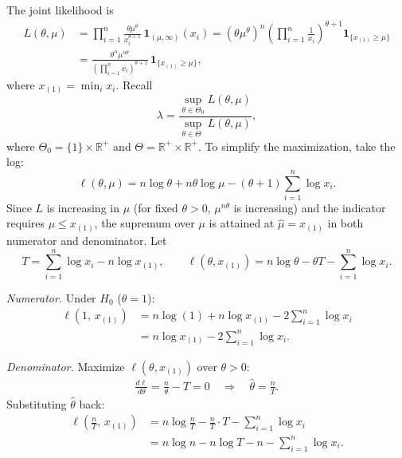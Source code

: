 \documentclass{article}
\theoremstyle{plain}
\theoremstyle{definition}
\newcommand{\bbR}{\mathbb{R}}
\newcommand{\ind}[1]{\bm{1}_{\{#1\}}}
\begin{document}
The joint likelihood is
\begin{align*}
  L(\theta,\mu)
  &=
  \prod_{i=1}^{n}\frac{\theta\mu^{\theta}}{x_i^{\theta+1}}\,\mathbf{1}_{(\mu,\infty)}(x_i)
  =
  (\theta\mu^{\theta})^{n}\!\left(\prod_{i=1}^{n}\frac{1}{x_i}\right)^{\!\theta+1}
  \ind{x_{(1)}\ge\mu}\\
  &= \frac{\theta^{n}\mu^{n\theta}}{(\prod_{i=1}^{n}x_i)^{\theta+1}}\,
  \ind{x_{(1)}\ge\mu},
\end{align*}
where $x_{(1)}=\min_i x_i$.  Recall
\[
  \lambda
  = \frac{\displaystyle\sup_{\theta\in\Theta_0}L(\theta,\mu)}
  {\displaystyle\sup_{\theta\in\Theta\phantom{_0}}L(\theta,\mu)},
\]
where $\Theta_0=\{1\}\times\bbR^+$ and $\Theta=\bbR^+\times\bbR^+$.
To simplify the maximization, take the log:
\[
  \ell(\theta,\mu) = n\log\theta + n\theta\log\mu -
  (\theta+1)\sum_{i=1}^{n}\log x_i.
\]
Since $L$ is increasing in $\mu$ (for fixed $\theta>0$, $\mu^{n\theta}$
is increasing) and the indicator requires $\mu\le x_{(1)}$, the
supremum over $\mu$ is attained at $\hat\mu=x_{(1)}$ in both numerator
and denominator.  Let
\[
  T = \sum_{i=1}^{n}\log x_i - n\log x_{(1)}, \qquad
  \ell(\theta,x_{(1)}) = n\log\theta - \theta T - \sum_{i=1}^{n}\log x_i.
\]

\medskip
\noindent\textit{Numerator.}
Under $H_0$ ($\theta=1$):
\begin{align*}
  \ell(1,\,x_{(1)})
  &= n\log(1) + n\log x_{(1)} - 2\sum_{i=1}^{n}\log x_i \\
  &= n\log x_{(1)} - 2\sum_{i=1}^{n}\log x_i.
\end{align*}

\medskip
\noindent\textit{Denominator.}
Maximize $\ell(\theta,x_{(1)})$ over $\theta>0$:
\begin{align*}
  \frac{d\ell}{d\theta} = \frac{n}{\theta} - T = 0
  \quad\Longrightarrow\quad
  \hat{\theta} = \frac{n}{T}.
\end{align*}
Substituting $\hat\theta$ back:
\begin{align*}
  \ell\!\left(\frac{n}{T},\,x_{(1)}\right)
  &= n\log\frac{n}{T} - \frac{n}{T}\cdot T - \sum_{i=1}^{n}\log x_i \\
  &= n\log n - n\log T - n - \sum_{i=1}^{n}\log x_i.
\end{align*}
\end{document}
